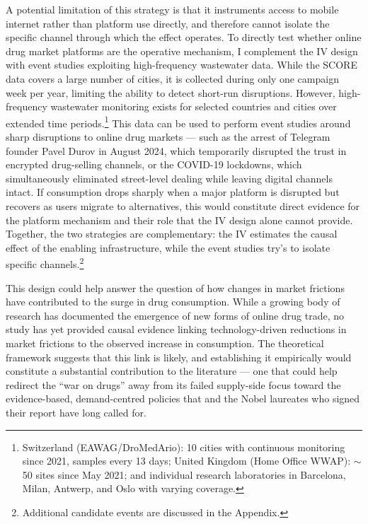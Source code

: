 \documentclass[12pt, a4paper]{article}
\begin{document}
A potential limitation of this strategy is that it instruments access to mobile internet rather than platform use directly, and therefore cannot isolate the specific channel through which the effect operates. To directly test whether online drug market platforms are the operative mechanism, I complement the IV design with event studies exploiting high-frequency wastewater data. While the SCORE data covers a large number of cities, it is collected during only one campaign week per year, limiting the ability to detect short-run disruptions. However, high-frequency wastewater monitoring exists for selected countries and cities over extended time periods.\footnote{Switzerland (EAWAG/DroMedArio): 10 cities with continuous monitoring since 2021, samples every 13 days; United Kingdom (Home Office WWAP): $\sim$50 sites since May 2021; and individual research laboratories in Barcelona, Milan, Antwerp, and Oslo with varying coverage.} This data can be used to perform event studies around sharp disruptions to online drug markets --- such as the arrest of Telegram founder Pavel Durov in August 2024, which temporarily disrupted the trust in encrypted drug-selling channels, or the COVID-19 lockdowns, which simultaneously eliminated street-level dealing while leaving digital channels intact. If consumption drops sharply when a major platform is disrupted but recovers as users migrate to alternatives, this would constitute direct evidence for the platform mechanism and their role that the IV design alone cannot provide. Together, the two strategies are complementary: the IV estimates the causal effect of the enabling infrastructure, while the event studies try's to isolate specific channels.\footnote{Additional candidate events are discussed in the Appendix.}

This design could help answer the question of how changes in market frictions have contributed to the surge in drug consumption. While a growing body of research has documented the emergence of new forms of online drug trade, no study has yet provided causal evidence linking technology-driven reductions in market frictions to the observed increase in consumption. The theoretical framework suggests that this link is likely, and establishing it empirically would constitute a substantial contribution to the literature --- one that could help redirect the ``war on drugs'' away from its failed supply-side focus toward the evidence-based, demand-centred policies that \citet{lse_2014} and the Nobel laureates who signed their report have long called for.
\end{document}
